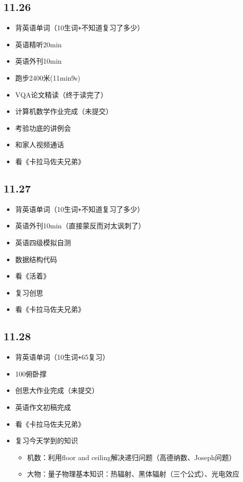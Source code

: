 \documentclass[UTF8]{ctexart}
\begin{document}
\subsection*{11.26}
\begin{itemize}
    \item 背英语单词（10生词\verb|+|不知道复习了多少）
    \item 英语精听20min
    \item 英语外刊10min
    \item 跑步2400米(11min9s)
    \item VQA论文精读（终于读完了）
    \item 计算机数学作业完成（未提交）
    \item 考验功底的讲例会
    \item 和家人视频通话
    \item 看《卡拉马佐夫兄弟》
\end{itemize}
\subsection*{11.27}
\begin{itemize}
    \item 背英语单词（10生词\verb|+|不知道复习了多少）
    \item 英语外刊10min（直接蒙反而对太讽刺了）
    \item 英语四级模拟自测
    \item 数据结构代码
    \item 看《活着》
    \item 复习创思
    \item 看《卡拉马佐夫兄弟》
\end{itemize}
\subsection*{11.28}
\begin{itemize}
    \item 背英语单词（10生词\verb|+|65复习）
    \item 100俯卧撑
    \item 创思大作业完成（未提交）
    \item 英语作文初稿完成
    \item 看《卡拉马佐夫兄弟》
    \item 复习今天学到的知识
          \begin{itemize}
              \item 机数：利用floor and ceiling解决递归问题（高德纳数、Joseph问题）
              \item 大物：量子物理基本知识：热辐射、黑体辐射（三个公式）、光电效应
          \end{itemize}
\end{itemize}
\end{document}
